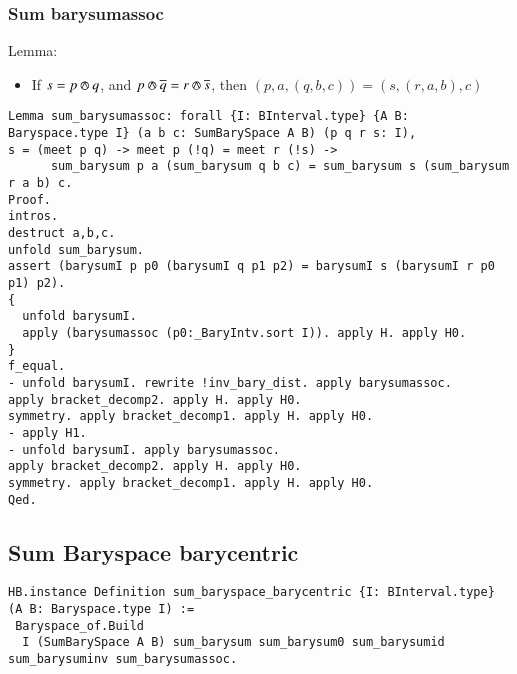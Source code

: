 \documentclass[a4paper,10pt]{article} %
\newcommand{\meet}{\circledwedge}
\begin{document}
\subsubsection{Sum barysumassoc}
Lemma:
\begin{itemize}
    \item If $s = p \meet q$, and $p \meet \overline{q} = r \meet \overline{s}$, then $(p, a, (q, b, c)) = (s, (r, a, b), c)$
\end{itemize}
\begin{lstlisting}
Lemma sum_barysumassoc: forall {I: BInterval.type} {A B: Baryspace.type I} (a b c: SumBarySpace A B) (p q r s: I),
s = (meet p q) -> meet p (!q) = meet r (!s) ->  
      sum_barysum p a (sum_barysum q b c) = sum_barysum s (sum_barysum r a b) c.
Proof.
intros.
destruct a,b,c.
unfold sum_barysum. 
assert (barysumI p p0 (barysumI q p1 p2) = barysumI s (barysumI r p0 p1) p2).
{
  unfold barysumI.
  apply (barysumassoc (p0:_BaryIntv.sort I)). apply H. apply H0.
} 
f_equal. 
- unfold barysumI. rewrite !inv_bary_dist. apply barysumassoc.
apply bracket_decomp2. apply H. apply H0.
symmetry. apply bracket_decomp1. apply H. apply H0.
- apply H1.
- unfold barysumI. apply barysumassoc.
apply bracket_decomp2. apply H. apply H0.
symmetry. apply bracket_decomp1. apply H. apply H0.
Qed.
\end{lstlisting}

\subsection{Sum Baryspace barycentric}
\begin{lstlisting}
HB.instance Definition sum_baryspace_barycentric {I: BInterval.type} (A B: Baryspace.type I) := 
 Baryspace_of.Build 
  I (SumBarySpace A B) sum_barysum sum_barysum0 sum_barysumid sum_barysuminv sum_barysumassoc.
\end{lstlisting}
\end{document}
